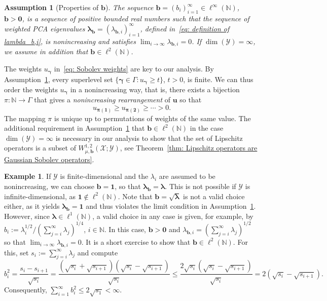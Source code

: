 \documentclass[namedate,webpdf]{ima-authoring-template-blank}
\newcounter{counter}
\numberwithin{counter}{section}
\numberwithin{equation}{section}
\theoremstyle{plain}
\newtheorem{assumption}[counter]{Assumption}
\theoremstyle{definition}
\newtheorem{example}[counter]{Example}
\newcommand*{\cX}{\mathcal{X}}
\newcommand*{\cY}{\mathcal{Y}}
\newcommand*{\bbN}{\mathbb{N}}
\theoremstyle{thmstyletwo}
\begin{document}
\begin{assumption}[Properties of \(\bm{b}\)]
\label{ass: properties of b}
    The sequence \(\bm{b} = (b_i)_{i=1}^{\infty} \in \ell^{\infty}(\bbN) \), \(\bm{b} > \bm{0} \), is a sequence of positive bounded real numbers such that the sequence of weighted PCA eigenvalues \(\bm{\lambda_b} = (\lambda_{\bm{b}, i})_{i=1}^{\infty}\), defined in~\eqref{eq: definition of lambda_b,i}, is nonincreasing and satisfies \(\lim_{i \to \infty} \lambda_{\bm{b},i} = 0\). If \(\dim(\cY) = \infty\), we assume in addition that \(\bm{b} \in \ell^2(\bbN)\).
\end{assumption}

The weights \(u_{\bm{\gamma}}\) in~\eqref{eq: Sobolev weights} are key to our analysis.
By Assumption~\ref{ass: properties of b}, every superlevel set \( \{ \bm{\gamma} \in \Gamma : u_{\bm{\gamma}} \geq t \} \), \( t > 0 \), is finite. We can thus order the weights \(u_{\bm{\gamma}}\) in a nonincreasing way, that is, there exists a bijection $\pi: \bbN \to \Gamma$ that gives a \emph{nonincreasing rearrangement} of \(\bm{u}\) so that
\begin{equation}
\label{eq: nonincreasing rearrangement pi}
    u_{\bm{\pi(1)}} \geq u_{\bm{\pi(2)}} \geq \cdots > 0.
\end{equation}
The mapping \(\pi\) is unique up to permutations of weights of the same value. 
The additional requirement in Assumption~\ref{ass: properties of b} that \( \bm{b} \in \ell^2(\bbN) \) in the case \(\dim(\cY) = \infty\) is necessary in our analysis to show that the set of Lipschitz operators is a subset of $W_{\mu, \bm{b}}^{1, 2}(\cX; \cY)$, see Theorem~\ref{thm: Lipschitz operators are Gaussian Sobolev operators}.

\begin{example}
\label{ex: choices for b}
    If \(\cY\) is finite-dimensional and the \( \lambda_i \) are assumed to be nonincreasing, we can choose \(\bm{b} = \bm{1}\), so that \(\bm{\lambda_b} = \bm{\lambda}\). This is not possible if \(\cY\) is infinite-dimensional, as \(\bm{1} \not\in \ell^2(\bbN) \). Note that \( \bm{b} = \sqrt{\bm{\lambda}} \) is not a valid choice either, as it yields \( \bm{\lambda_b} = \bm{1} \) and thus violates the limit condition in Assumption~\ref{ass: properties of b}. However, since \(\bm{\lambda} \in \ell^1(\bbN)\), a valid choice in any case is given, for example, by \(b_i := \lambda_i^{1/2} / (\sum_{j = i}^{\infty} \lambda_j)^{1/4} \), \( i \in \bbN \). In this case, \(\bm{b} > \bm{0} \) and \( \lambda_{\bm{b}, i} = (\sum_{j = i}^{\infty} \lambda_j)^{1/2} \) so that \( \lim_{i \to \infty} \lambda_{\bm{b}, i} = 0 \).  It is a short exercise to show that \( \bm{b} \in \ell^2(\bbN) \). For this, set \( s_i := \sum_{j = i}^{\infty} \lambda_j \) and compute
    \[
    b_i^2 = \frac{s_i - s_{i + 1}}{\sqrt{s_i}} = \frac{(\sqrt{s_i} + \sqrt{s_{i+1}})(\sqrt{s_i} - \sqrt{s_{i+1}})}{\sqrt{s_i}}
    \leq \frac{2 \sqrt{s_i} (\sqrt{s_i} - \sqrt{s_{i+1}})}{\sqrt{s_i}}
    = 2(\sqrt{s_i} - \sqrt{s_{i+1}}).
    \]
    Consequently, 
    \(
    \sum_{i = 1}^{\infty} b_i^2 \leq 2 \sqrt{s_1} < \infty.
    \)
\end{example}
\end{document}
